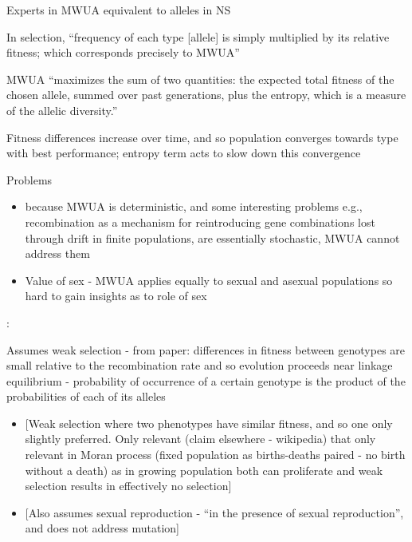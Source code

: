 \autocite{Barton2014}

	Experts in MWUA equivalent to alleles in NS

	In selection, ``frequency of each type {[}allele{]} is simply
	multiplied by its relative fitness; which corresponds precisely to
	MWUA''
	

	MWUA ``maximizes the sum of two quantities: the expected total fitness
	of the chosen allele, summed over past generations, plus the entropy,
	which is a measure of the allelic diversity.''
	
	
	Fitness differences increase over time, and so population converges
	towards type with best performance; entropy term acts to slow down
	this convergence
	

	Problems
	
	
	\begin{itemize}
		\item
		
		because MWUA is deterministic, and some interesting problems e.g.,
		recombination as a mechanism for reintroducing gene combinations
		lost through drift in finite populations, are essentially
		stochastic, MWUA cannot address them
		
		\item
		
		Value of sex - MWUA applies equally to sexual and asexual
		populations so hard to gain insights as to role of sex
		
	\end{itemize}

\autocite{Chastain2014}:

	Assumes weak selection - from paper: differences in fitness between
	genotypes are small relative to the recombination rate and so
	evolution proceeds near linkage equilibrium - probability of
	occurrence of a certain genotype is the product of the probabilities
	of each of its alleles
	
	
	\begin{itemize}
		\item
		
		{[}Weak selection where two phenotypes have similar fitness, and so
		one only slightly preferred. Only relevant (claim elsewhere -
		wikipedia) that only relevant in Moran process (fixed population as
		births-deaths paired - no birth without a death) as in growing
		population both can proliferate and weak selection results in
		effectively no selection{]}
		
		\item
		
		{[}Also assumes sexual reproduction - ``in the presence of sexual
		reproduction'', and does not address mutation{]}
		
	\end{itemize}

